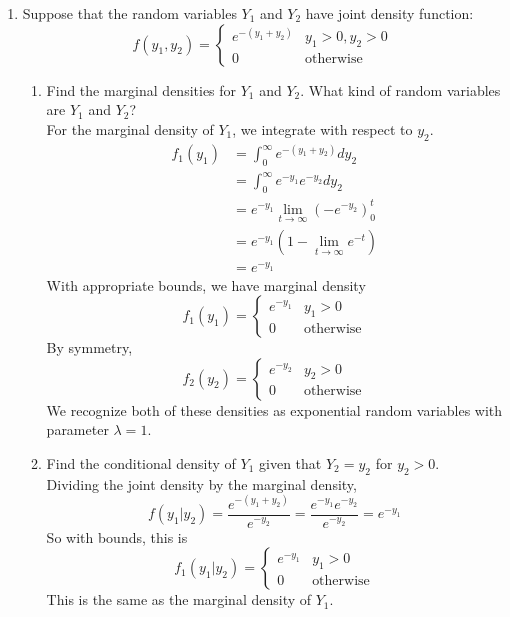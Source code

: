 \documentclass[12pt]{article}
\begin{document}
\begin{enumerate}
\begin{enumerate}
\end{enumerate}

\item Suppose that the random variables $Y_1$ and $Y_2$ have joint density function:
\[
f(y_1, y_2) = \begin{cases}
e^{-(y_1 + y_2)} & y_1 > 0, y_2 > 0 \\
0 & \text{otherwise}
\end{cases}
\]
\begin{enumerate}
\item Find the marginal densities for $Y_1$ and $Y_2$. What kind of random variables are $Y_1$ and $Y_2$?\\

For the marginal density of $Y_1$, we integrate with respect to $y_2$.
\begin{align*}
f_1(y_1) &= \int_0^\infty e^{-(y_1 + y_2)} dy_2 \\
&= \int_0^\infty e^{-y_1} e^{-y_2} dy_2 \\
&= e^{-y_1} \lim_{t \rightarrow \infty}(-e^{-y_2})_0^t \\
&= e^{-y_1} (1 - \lim_{t \rightarrow \infty} e^{-t} ) \\
&= e^{-y_1} 
\end{align*}
With appropriate bounds, we have marginal density
\[
f_1(y_1) = \begin{cases}
e^{-y_1} & y_1 > 0 \\
0 & \text{otherwise}
\end{cases}
\]
By symmetry,
\[
f_2(y_2) = \begin{cases}
e^{-y_2} & y_2 > 0 \\
0 & \text{otherwise}
\end{cases}
\]
We recognize both of these densities as exponential random variables with parameter $\lambda = 1$.

\item Find the conditional density of $Y_1$ given that $Y_2 = y_2$ for $y_2 > 0$.\\

Dividing the joint density by the marginal density,
\[
f(y_1 | y_2) = \frac{ e^{-(y_1 + y_2)} }{ e^{-y_2} } = \frac{e^{-y_1}e^{-y_2} } { e^{-y_2} } = e^{-y_1}
\]
So with bounds, this is
\[
f_1(y_1|y_2) = \begin{cases}
e^{-y_1} & y_1 > 0 \\
0 & \text{otherwise}
\end{cases}
\]
This is the same as the marginal density of $Y_1$.


\end{enumerate}
\end{enumerate}
\end{document}
